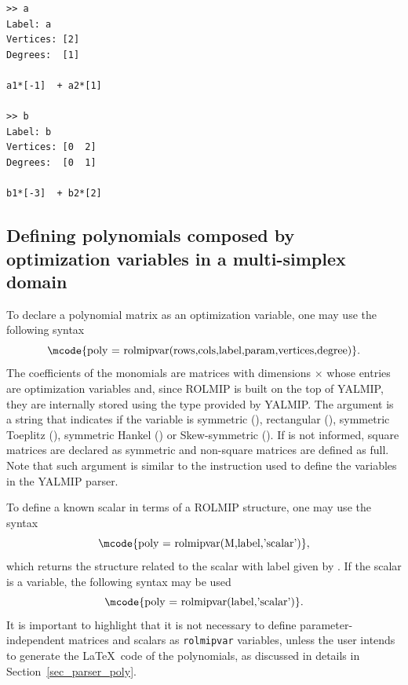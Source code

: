 \documentclass[english,11pt]{article}
\theoremstyle{break} \theorembodyfont{\small\rm}
\begin{document}
\begin{minipage}{9.0cm}
\begin{lstlisting}[rulecolor=\color{red}]
>> a
Label: a
Vertices: [2]
Degrees:  [1]
 
a1*[-1]  + a2*[1] 

>> b
Label: b
Vertices: [0  2]
Degrees:  [0  1]
 
b1*[-3]  + b2*[2] 
\end{lstlisting}
\end{minipage}



% 
% 
% 







\subsection{Defining polynomials composed by optimization  variables in a multi-simplex domain}

To declare a polynomial matrix as an optimization variable, one may use the following syntax
\[
\mbox{\mcode{poly = rolmipvar(rows,cols,label,param,vertices,degree)}}. 
\]
The coefficients of the monomials are matrices with dimensions  $\times$  
whose entries are optimization variables and, since ROLMIP is built on the top of YALMIP, they 
are internally stored using the  type provided by YALMIP. 
The argument 
is a string that indicates if the variable is symmetric (), 
rectangular (), 
symmetric Toeplitz (), symmetric
Hankel () or Skew-symmetric ().
If  is not informed, square matrices are declared as symmetric
and non-square matrices are defined as full.
Note that such argument is similar to the  instruction
used to define the variables in the YALMIP parser.

To define a known scalar in terms of a ROLMIP structure, one may use the syntax
\[
\mbox{\mcode{poly = rolmipvar(M,label,'scalar')}},
\]
which returns the structure related to the scalar  with label given by .
If the scalar is a  variable, the following syntax may be used
\[
\mbox{\mcode{poly = rolmipvar(label,'scalar')}}.
\]
It is important to highlight that it is not necessary to define parameter-independent matrices and 
scalars as \texttt{rolmipvar} variables, unless the user intends to generate the \LaTeX ~code of the
polynomials, as discussed in details in Section~\ref{sec_parser_poly}.
\end{document}
